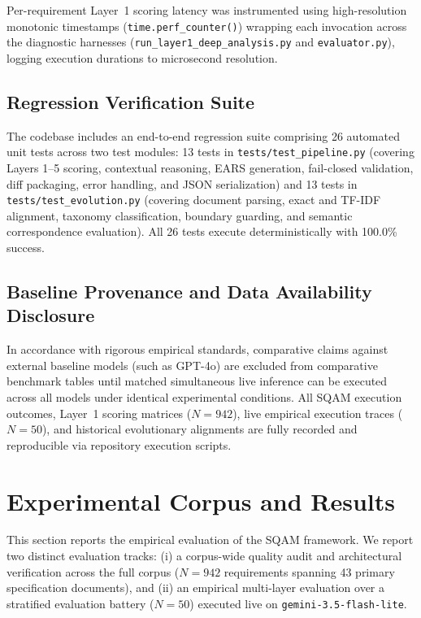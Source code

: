 \documentclass[journal]{IEEEtran}
\begin{document}
Per-requirement Layer~1 scoring latency was instrumented using high-resolution monotonic timestamps (\texttt{time.perf\_counter()}) wrapping each invocation across the diagnostic harnesses (\texttt{run\_layer1\_deep\_analysis.py} and \texttt{evaluator.py}), logging execution durations to microsecond resolution.

\subsection{Regression Verification Suite}
\label{sec:test-suite}

The codebase includes an end-to-end regression suite comprising 26 automated unit tests across two test modules: 13 tests in \texttt{tests/test\_pipeline.py} (covering Layers 1--5 scoring, contextual reasoning, EARS generation, fail-closed validation, diff packaging, error handling, and JSON serialization) and 13 tests in \texttt{tests/test\_evolution.py} (covering document parsing, exact and TF-IDF alignment, taxonomy classification, boundary guarding, and semantic correspondence evaluation). All 26 tests execute deterministically with 100.0\% success.

\subsection{Baseline Provenance and Data Availability Disclosure}
\label{sec:baseline-provenance}

In accordance with rigorous empirical standards, comparative claims against external baseline models (such as GPT-4o) are excluded from comparative benchmark tables until matched simultaneous live inference can be executed across all models under identical experimental conditions. All SQAM execution outcomes, Layer~1 scoring matrices ($N=942$), live empirical execution traces ($N=50$), and historical evolutionary alignments are fully recorded and reproducible via repository execution scripts.

\section{Experimental Corpus and Results}
\label{sec:results}

This section reports the empirical evaluation of the SQAM framework. We report two distinct evaluation tracks: (i) a corpus-wide quality audit and architectural verification across the full corpus ($N=942$ requirements spanning 43 primary specification documents), and (ii) an empirical multi-layer evaluation over a stratified evaluation battery ($N=50$) executed live on \texttt{gemini-3.5-flash-lite}.
\end{document}
